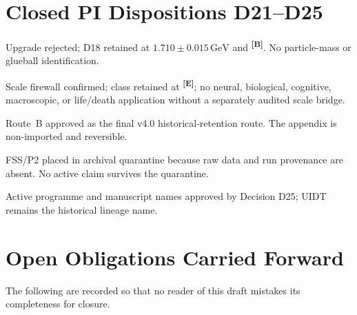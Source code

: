 \documentclass[12pt,a4paper,twoside]{article}
\theoremstyle{plain}
\theoremstyle{definition}
\theoremstyle{remark}
\newcommand{\catmark}[1]{\textsuperscript{\textsf{\textbf{[#1]}}}}
\begin{document}
\section{Closed PI Dispositions D21--D25}
\label{sec:closed-pi-dispositions}

\begin{description}[leftmargin=2.8cm,style=nextline]
\item[D21 --- $\Delta$.] Upgrade rejected; D18 retained at
$1.710\pm0.015\,\mathrm{GeV}$ and \catmark{B}. No particle-mass or glueball
identification.
\item[D22 --- $E_T$.] Scale firewall confirmed; class retained at
\catmark{E}; no neural, biological, cognitive, macroscopic, or life/death
application without a separately audited scale bridge.
\item[D23 --- Museum.] Route~B approved as the final v4.0 historical-retention
route. The appendix is non-imported and reversible.
\item[D24 --- P2.] FSS/P2 placed in archival quarantine because raw data and
run provenance are absent. No active claim survives the quarantine.
\item[D25 --- Name.] Active programme and manuscript names approved by Decision D25; UIDT remains the historical lineage name.
\end{description}

\section*{Open Obligations Carried Forward}

\noindent The following are recorded so that no reader of this draft
mistakes its completeness for closure.
\end{document}
